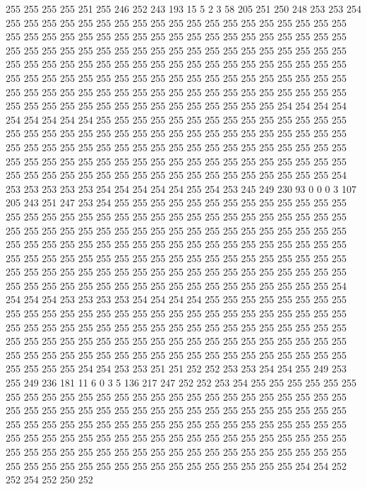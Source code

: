 255 255 255 255 251 255 246 252 243 193 15 5 2 3 58 205 251 250 248 253
253 254 255 255 255 255 255 255 255 255 255 255 255 255 255 255 255 255 255 255
255 255 255 255 255 255 255 255 255 255 255 255 255 255 255 255 255 255 255 255
255 255 255 255 255 255 255 255 255 255 255 255 255 255 255 255 255 255 255 255
255 255 255 255 255 255 255 255 255 255 255 255 255 255 255 255 255 255 255 255
255 255 255 255 255 255 255 255 255 255 255 255 255 255 255 255 255 255 255 255
255 255 255 255 255 255 255 255 255 255 255 255 255 255 255 255 255 255 255 255
255 255 255 255 255 255 255 255 255 255 255 254 254 254 254 254 254 254 254 254
255 255 255 255 255 255 255 255 255 255 255 255 255 255 255 255 255 255 255 255
255 255 255 255 255 255 255 255 255 255 255 255 255 255 255 255 255 255 255 255
255 255 255 255 255 255 255 255 255 255 255 255 255 255 255 255 255 255 255 255
255 255 255 255 255 255 255 255 255 255 255 255 255 255 255 255 255 255 255 255
255 255 255 255 255 255 255 255 255 254 253 253 253 253 253 254 254 254 254 254
255 254 253 245 249 230 93 0 0 0 3 107 205 243 251 247 253 254 255 255
255 255 255 255 255 255 255 255 255 255 255 255 255 255 255 255 255 255 255 255
255 255 255 255 255 255 255 255 255 255 255 255 255 255 255 255 255 255 255 255
255 255 255 255 255 255 255 255 255 255 255 255 255 255 255 255 255 255 255 255
255 255 255 255 255 255 255 255 255 255 255 255 255 255 255 255 255 255 255 255
255 255 255 255 255 255 255 255 255 255 255 255 255 255 255 255 255 255 255 255
255 255 255 255 255 255 255 255 255 255 255 255 255 255 255 255 255 255 255 255
255 255 255 255 254 254 254 254 253 253 253 253 254 254 254 254 255 255 255 255
255 255 255 255 255 255 255 255 255 255 255 255 255 255 255 255 255 255 255 255
255 255 255 255 255 255 255 255 255 255 255 255 255 255 255 255 255 255 255 255
255 255 255 255 255 255 255 255 255 255 255 255 255 255 255 255 255 255 255 255
255 255 255 255 255 255 255 255 255 255 255 255 255 255 255 255 255 255 255 255
255 255 255 255 254 254 253 253 251 251 252 252 253 253 254 254 255 249 253 255
249 236 181 11 6 0 3 5 136 217 247 252 252 253 254 255 255 255 255 255
255 255 255 255 255 255 255 255 255 255 255 255 255 255 255 255 255 255 255 255
255 255 255 255 255 255 255 255 255 255 255 255 255 255 255 255 255 255 255 255
255 255 255 255 255 255 255 255 255 255 255 255 255 255 255 255 255 255 255 255
255 255 255 255 255 255 255 255 255 255 255 255 255 255 255 255 255 255 255 255
255 255 255 255 255 255 255 255 255 255 255 255 255 255 255 255 255 255 255 255
255 255 255 255 255 255 255 255 255 255 255 255 254 254 252 252 254 252 250 252
